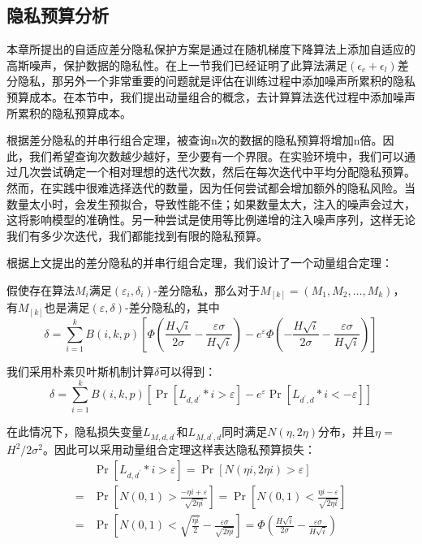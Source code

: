 \subsection{隐私预算分析}
本章所提出的自适应差分隐私保护方案是通过在随机梯度下降算法上添加自适应的高斯噪声，保护数据的隐私性。在上一节我们已经证明了此算法满足$\left(\epsilon_{c}+\epsilon_{l}\right)$差分隐私，那另外一个非常重要的问题就是评估在训练过程中添加噪声所累积的隐私预算成本。在本节中，我们提出动量组合的概念，去计算算法迭代过程中添加噪声所累积的隐私预算成本。

根据差分隐私的并串行组合定理，被查询n次的数据的隐私预算将增加n倍。因此，我们希望查询次数越少越好，至少要有一个界限。在实验环境中，我们可以通过几次尝试确定一个相对理想的迭代次数，然后在每次迭代中平均分配隐私预算。然而，在实践中很难选择迭代的数量，因为任何尝试都会增加额外的隐私风险。当数量太小时，会发生预拟合，导致性能不佳；如果数量太大，注入的噪声会过大，这将影响模型的准确性。另一种尝试是使用等比例递增的注入噪声序列，这样无论我们有多少次迭代，我们都能找到有限的隐私预算。

根据上文提出的差分隐私的并串行组合定理，我们设计了一个动量组合定理：
\begin{theorem}[动量组合定理]\label{动量组合定理}
假使存在算法$M_{i}$满足$\left(\varepsilon_{i}, \delta_{i}\right)$-差分隐私，那么对于$M_{[k]}=\left(M_{1}, M_{2}, \ldots, M_{k}\right)$，有$M_{[k]}$也是满足$(\varepsilon, \delta)$-差分隐私的，其中
$$
\delta=\sum_{i=1}^{k} B(i, k, p)\left[\Phi\left(\frac{H \sqrt{i}}{2 \sigma}-\frac{\varepsilon \sigma}{H \sqrt{i}}\right)-e^{\varepsilon} \Phi\left(-\frac{H \sqrt{i}}{2 \sigma}-\frac{\varepsilon \sigma}{H \sqrt{i}}\right)\right]
$$
\end{theorem}

我们采用朴素贝叶斯机制计算$\delta$可以得到：
\begin{equation}\label{eq:朴素贝叶斯}
\delta=\sum_{i=1}^{k} B(i, k, p)\left[\operatorname{Pr}\left[L_{d, d^{\prime}} * i>\varepsilon\right]-e^{\varepsilon} \operatorname{Pr}\left[L_{d^{\prime}, d} * i<-\varepsilon\right]\right]
\end{equation}

在此情况下，隐私损失变量$L_{M, d, d^{\prime}}$和$L_{M, d^{\prime}, d}$同时满足$N(\eta, 2 \eta)$分布，并且$\eta=$ $H^{2} / 2 \sigma^{2}$。因此可以采用动量组合定理这样表达隐私预算损失：
\begin{equation}\label{eq:隐私预算计算1}
\begin{aligned}
& \operatorname{Pr}\left[L_{d, d^{\prime}} * i>\varepsilon\right]=\operatorname{Pr}[N(\eta i, 2 \eta i)>\varepsilon] \\
=& \operatorname{Pr}\left[N(0,1)>\frac{-\eta i+\varepsilon}{\sqrt{2 \eta i}}\right]=\operatorname{Pr}\left[N(0,1)<\frac{\eta i-\varepsilon}{\sqrt{2 \eta i}}\right] \\
=& \operatorname{Pr}\left[N(0,1)<\sqrt{\frac{\eta i}{2}}-\frac{\varepsilon \sigma}{\sqrt{2 \eta i}}\right]=\Phi\left(\frac{H \sqrt{i}}{2 \sigma}-\frac{\varepsilon \sigma}{H \sqrt{i}}\right)
\end{aligned}
\end{equation}

